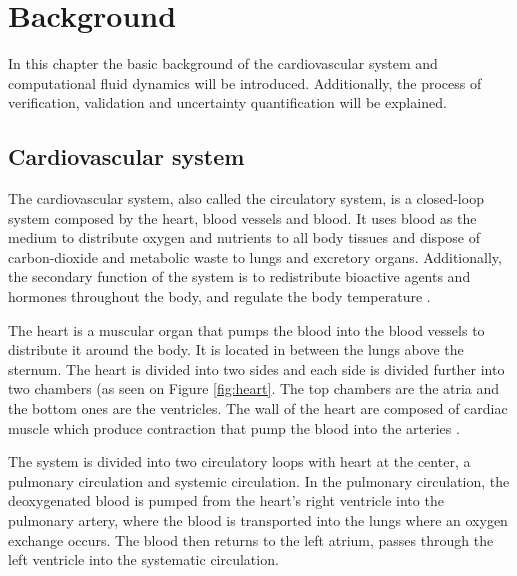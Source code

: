 \chapter{Background}
\label{chapterlabel2}
In this chapter the basic background of the cardiovascular system and computational fluid dynamics will be introduced. Additionally, the process of verification, validation and uncertainty quantification will be explained.


\section{Cardiovascular system}
The cardiovascular system, also called the circulatory system, is a closed-loop system composed by the heart, blood vessels and blood. It uses blood as the medium to distribute oxygen and nutrients to all body tissues and dispose of carbon-dioxide and metabolic waste to lungs and excretory organs. Additionally, the secondary function of the system is to redistribute bioactive agents and hormones throughout the body, and regulate the body temperature \cite{Levick2010Introduction5ed}.\par

The heart is a muscular organ that  pumps the blood into the blood vessels to distribute it around the body. It is located in between the lungs above the sternum. The heart is divided into two sides and each side is divided further into two chambers (as seen on Figure \ref{fig:heart}. The top chambers are the atria and the bottom ones are the ventricles. The wall of the heart are composed of cardiac muscle which produce contraction that pump the blood into the arteries \cite{aaronson2012cardiovascular,tortora2017introduction}. \par

The system is divided into two circulatory loops with heart at the center, a pulmonary circulation and systemic circulation. In the pulmonary circulation, the deoxygenated blood is pumped from the heart's right ventricle into the pulmonary artery, where the blood is transported into the lungs where an oxygen exchange occurs. The blood then returns to the left atrium, passes through the left ventricle into the systematic circulation\cite{Levick2010Introduction5ed,tortora2017introduction}. \par



